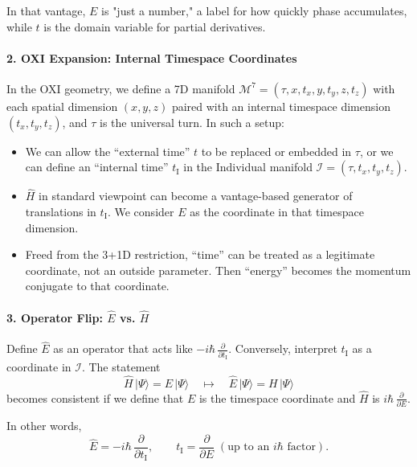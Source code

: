 \documentclass{article}
\begin{document}
In that vantage, $E$ is "just a number," a label for how quickly phase accumulates, while $t$ is the domain variable for partial derivatives.

\paragraph{2. OXI Expansion: Internal Timespace Coordinates}\vspace{-6pt}
In the OXI geometry, we define a 7D manifold $\mathcal{M}^7=(\tau, x, t_x, y, t_y, z, t_z)$ with each spatial dimension $(x,y,z)$ paired with an internal timespace dimension $(t_x, t_y, t_z)$, and $\tau$ is the universal turn. In such a setup:
\begin{itemize}
\item We can allow the “external time” $t$ to be replaced or embedded in $\tau$, or we can define an “internal time” $t_{\mathrm{I}}$ in the Individual manifold $\mathcal{I}=(\tau, t_x, t_y, t_z)$.\vspace{-4pt}
\item $\hat{H}$ in standard viewpoint can become a vantage-based generator of translations in $t_{\mathrm{I}}$. We consider $E$ as the coordinate in that timespace dimension.\vspace{-4pt}
\item Freed from the 3+1D restriction, “time” can be treated as a legitimate coordinate, not an outside parameter. Then “energy” becomes the momentum conjugate to that coordinate.
\end{itemize}

\paragraph{3. Operator Flip: $\hat{E}$ vs. $\hat{H}$}\vspace{-6pt}
Define $\hat{E}$ as an operator that acts like $-i\hbar\,\tfrac{\partial}{\partial t_{\mathrm{I}}}$. Conversely, interpret $t_{\mathrm{I}}$ as a coordinate in $\mathcal{I}$. The statement
\begin{equation}
\hat{H}\,\lvert\Psi\rangle= E\,\lvert\Psi\rangle\quad\longmapsto\quad \hat{E}\,\lvert\Psi\rangle= H\,\lvert\Psi\rangle
\end{equation}
becomes consistent if we define that $E$ is the timespace coordinate and $\hat{H}$ is $i\hbar\,\tfrac{\partial}{\partial E}$. 

In other words,
\begin{equation}\label{eq:EnergyAsCoordinate}
\hat{E}= -i\hbar\,\frac{\partial}{\partial t_{\mathrm{I}}},\quad\quad t_{\mathrm{I}}= \frac{\partial}{\partial E}\; (\text{up to an } i\hbar \text{ factor}).
\end{equation}
\end{document}
